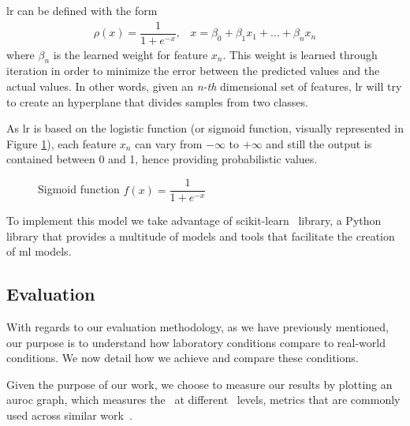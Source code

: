 \gls{lr} can be defined with the form
\begin{eqnarray*}
	\rho(x) = \dfrac{1}{1 + e^{-x}},&x = \beta_0 + \beta_1x_1 + ... + \beta_nx_n
\end{eqnarray*}
where $\beta_n$ is the learned weight for feature $x_n$.
This weight is learned through iteration in order to minimize the error between the predicted values and the actual values.
In other words, given an \textit{n-th} dimensional set of features, \gls{lr} will try to create an hyperplane that divides samples from two classes.

As \gls{lr} is based on the logistic function (or sigmoid function, visually represented in Figure \ref{fig:sigmoid_function}), each feature $x_n$ can vary from $-\infty$ to $+\infty$ and still the output is contained between 0 and 1, hence providing probabilistic values.

\begin{figure}[!h]
	\centering
	\caption{Sigmoid function $f(x)=\dfrac{1}{1+e^{-x}}$}
	\label{fig:sigmoid_function}
\end{figure}

To implement this model we take advantage of scikit-learn~\cite{tool:sklearn} library, a Python library that provides a multitude of models and tools that facilitate the creation of \gls{ml} models.

\subsection{Evaluation}
\label{section:evaluation}

With regards to our evaluation methodology, as we have previously mentioned, our purpose is to understand how laboratory conditions compare to real-world conditions.
We now detail how we achieve and compare these conditions.

Given the purpose of our work, we choose to measure our results by plotting an \gls{auroc} graph, which measures the \tpr~at different \fpr~levels, metrics that are commonly used across similar work~\cite{miller:rev_int,nissim:al_pdf,schultz:data_mining}.


